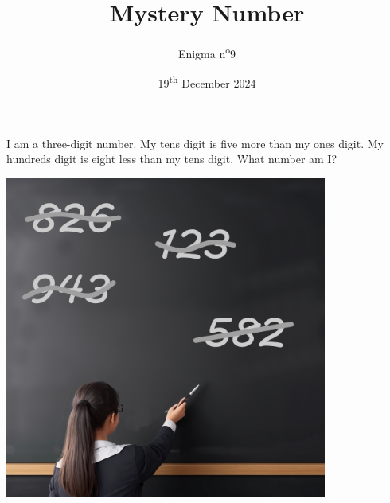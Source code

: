 \documentclass[a4paper, top=10mm]{article}
\title{\textbf{\huge{Mystery Number}}}
\author{Enigma n\textsuperscript{o}9}
\date{19\textsuperscript{th} December 2024}
\begin{document}
	\maketitle
	
	 I am a three-digit number.
	 My tens digit is five more than my ones digit.
	 My hundreds digit is eight less than my tens digit.
	 What number am I?
	
	\begin{center}
		\includegraphics[height=300pt]{09tries.png}
	\end{center}
	
	
\end{document}
